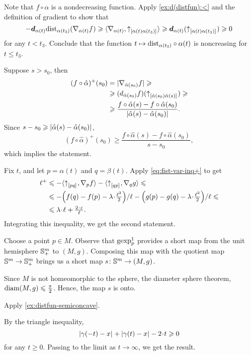 Note that $f\circ\alpha$ is a nondecreasing function.
Apply \ref{ex:d(distfun):<} and the definition of gradient to show that
\[
-\bm{d}_{\alpha(t)}\mathrm{dist}_{\alpha(t_3)}(\nabla_{\alpha(t)}f)
\geqslant
\langle \nabla_{\alpha(t)},{\uparrow}_{[{\alpha(t)}{\alpha(t_3)}]_{{}}}\rangle
\geqslant
\bm{d}_{\alpha(t)}({\uparrow}_{[{\alpha(t)}{\alpha(t_3)}]_{{}}})
\geqslant0
\]
for any $t<t_3$.
Conclude that the function 
$t\mapsto \mathrm{dist}_{\alpha(t_3)}\circ\alpha(t)$ is noncreasing for $t\le t_3$.

Suppose $s>s_0$, then
\begin{align*}
(f\circ\hat\alpha)^+(s_0)&=|\nabla_{\hat\alpha(s_0)}f|
\geqslant
\\
&\geqslant
(d_{\hat\alpha(s_0)}f)({\uparrow}_{[{\hat\alpha(s_0)}{\hat\alpha(s)}]_{{}}})
\geqslant
\\
&\geqslant
\frac{f\circ\hat\alpha(s)-f\circ\hat\alpha(s_0)}{|{\hat\alpha(s)}-{\hat\alpha(s_0)}|_{}^{{}}}.
\end{align*} 
Since $s-s_0\geqslant|{\hat\alpha(s)}-{\hat\alpha(s_0)}|_{}^{{}}$,
\[(f\circ\hat\alpha)^+(s_0)\ge
\frac{f\circ\hat\alpha(s)-f\circ\hat\alpha(s_0)}{s-s_0},\]
which implies the statement.

Fix $t$, and let $p=\alpha(t)$ and $q=\beta(t)$.
Apply \ref{eq:fist-var-inq+} to get
\begin{align*}
 \ell^+
&\le -\<\dir{p}{q},\nabla_{p}f\>
-\<\dir{q}{p},\nabla_{q}g\>
\le
\\
&\le -{\left({f(q)}-{f(p)}-\lambda\cdot\tfrac{\ell^2}2\right)}/{\ell}
-{\left({g(p)}-{g(q)}-\lambda\cdot\tfrac{\ell^2}2\right)}/{\ell}\le
\\
&\le \lambda\cdot\ell+\tfrac{2\cdot\eps}{\ell}.
\end{align*}
Integrating this inequality, we get the second statement.

Choose a point $p\in M$.
Observe that $\operatorname{\rm gexp}\nolimits_p^1$ provides a short map from the unit hemisphere $\mathbb{S}_+^m$ to $(M,g)$.
Composing this map with the quotient map $\mathbb{S}^m\to \mathbb{S}_+^m$ brings us a short map $s\colon\mathbb{S}^m\to(M,g)$.

Since $M$ is not homeomorphic to the sphere,
the diameter sphere theorem, $\operatorname{\rm diam}\nolimits (M,g)\leqslant \tfrac\pi2$.
Hence, the map $s$ is onto.

 Apply \ref{ex:distfun-semiconcave}.

 By the triangle inequality, 
\[\dist{\gamma(-t)}{x}{}+\dist{\gamma(t)}{x}{}-2\cdot t\ge 0\]
for any $t\ge 0$.
Passing to the limit as $t\to\infty$, we get the result.

